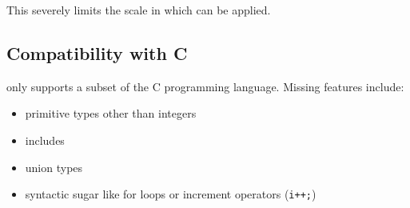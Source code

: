 \documentclass[12pt]{article}
\begin{document}
This severely limits the scale in which \verifyc can be applied.

\subsection{Compatibility with C}
\verifyc only supports a subset of the C programming language.
Missing features include:

\begin{itemize}
    \item primitive types other than integers
    \item includes
    \item union types
    \item syntactic sugar like for loops or increment operators (\texttt{i++;})
\end{itemize}
\end{document}
